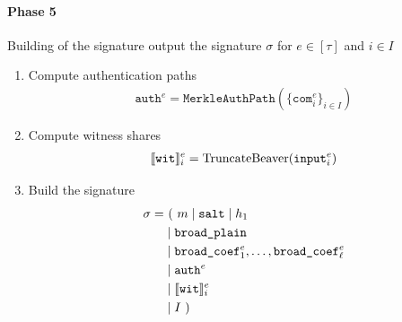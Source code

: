 \documentclass[11pt]{report}
\theoremstyle{definition}
\theoremstyle{plain}
\begin{document}
\begin{protocol}
  \paragraph{Phase 5} Building of the signature output the signature $\sigma$ for $e \in [\tau]$ and $i \in I$
  \begin{enumerate}[itemsep=0pt, topsep=0pt, parsep=0pt]
    \item Compute authentication paths
          \begin{align*}
            \texttt{auth}^e = \texttt{MerkleAuthPath}(\{\texttt{com}^e_i\}_{i \in I})
          \end{align*}
    \item Compute witness shares
          \begin{align*}
            \llbracket \texttt{wit} \rrbracket_i^e = \text{TruncateBeaver}(\texttt{input}^e_i)
          \end{align*}
    \item Build the signature
          \begin{align*}
            \sigma = & \ (\ m \mid \texttt{salt} \mid h_1                                \\
                     & \mid \texttt{broad\_plain}                                        \\
                     & \mid \texttt{broad\_coef}^e_1, \dots, \texttt{broad\_coef}^e_\ell \\
                     & \mid \texttt{auth}^e                                              \\
                     & \mid \llbracket \texttt{wit} \rrbracket_i^e                                        \\
                     & \mid I\ )
          \end{align*}
  \end{enumerate}
\end{protocol}
\end{document}
